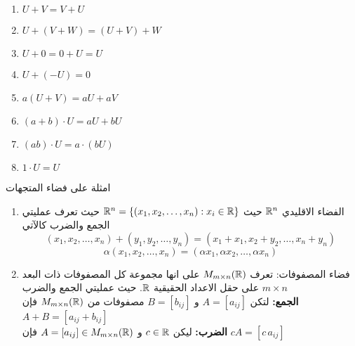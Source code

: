 \begin{frame}
	
	\pause
	\begin{english}
		\begin{enumerate}
			\item $U+V = V+U$
			\item $U+(V+W) = (U+V)+W$
			\item $U+0=0+U=U$
			\item $U+(-U) = 0$
			\item $a(U+V) = aU + aV$
			\item $(a+b)\cdot U = aU + bU$
			\item $(ab)\cdot U = a\cdot (bU)$
			\item $1\cdot U = U$
		\end{enumerate}
	\end{english}
\end{frame}

\begin{frame}{امثلة على فضاء المتجهات}
	
	\pause
	\begin{example}
			\begin{enumerate}
				\item الفضاء الاقليدي $\mathbb{R}^n$ حيث $\mathbb{R}^n = \{(x_1, x_2, \dots, x_n) : x_i \in \mathbb{R}\}$
				حيث تعرف عمليتي الجمع والضرب كالآتي
				\[
				(x_1, x_2, \dots, x_n) + (y_1, y_2, \dots, y_n)  = (x_1+x_1, x_2+y_2, \dots, x_n+y_n) 
				\]  
				\[
				\alpha (x_1, x_2, \dots, x_n)  = (\alpha x_1,\alpha x_2, \dots, \alpha x_n) 
				\]
				
				\pause
				\item فضاء المصفوفات: 
				تعرف $M_{m\times n}(\mathbb{R})$ على انها مجموعة كل المصفوفات ذات البعد $m \times n$ على حقل الاعداد الحقيقية $\mathbb{R}$. 
				حيث {عمليتي الجمع والضرب}\\
				\textbf{الجمع:} لتكن $A=[a_{ij}]$ و $B=[b_{ij}]$ مصفوفات من $M_{m\times n}(\mathbb{R})$ فإن 
				$
				A + B = [a_{ij} + b_{ij}] 
				$\\
				\textbf{الضرب:} ليكن $c\in \mathbb{R}$ و $A = [a_{ij}]\in M_{m\times n}(\mathbb{R})$ فإن 
				$
				cA = [c\, a_{ij}] 
				$
			\end{enumerate}
	\end{example}
\end{frame}

